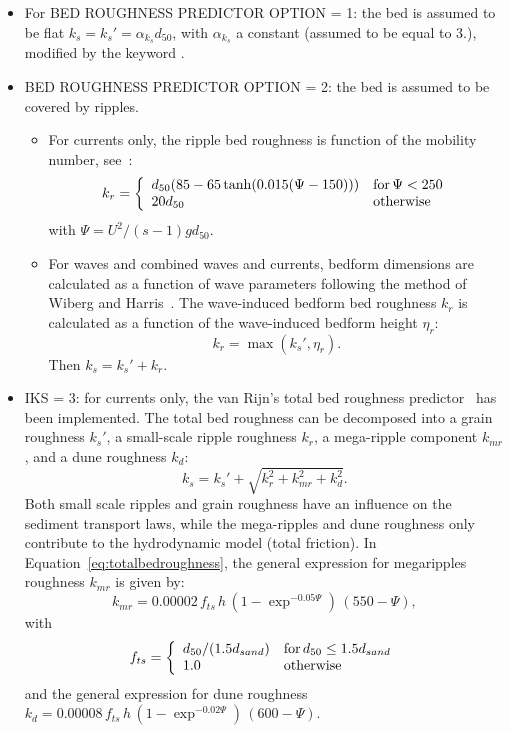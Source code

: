\begin{itemize}
\item For {\ttfamily BED ROUGHNESS PREDICTOR OPTION = 1}: the bed is assumed to be flat $k_s = k_s'= \alpha_{k_s} d_{50}$, with $\alpha_{k_s}$ a constant (assumed to be equal to $3.$), modified by the keyword . 
\item {\ttfamily BED ROUGHNESS PREDICTOR OPTION = 2}: the bed is assumed to be covered by ripples.
  \begin{itemize}
    \item For currents only, the ripple bed roughness is function of the mobility number, see~\cite{vanRijn07}:
\begin{equation*}
k_r =\left\{\begin{array}{ll}
d_{50}(85-65\tanh(0.015(\Psi-150))) & \text{for\,} \Psi<250\\
20 d_{50} & \text{otherwise} 
\end{array}
\right.
\end{equation*}
with $\Psi =U^2/(s-1)gd_{50}$.

    \item For waves and combined waves and currents, bedform dimensions are calculated
as a function of wave parameters following the method of Wiberg and Harris~\cite{WibergHarris}. 
The wave-induced bedform bed roughness $k_r$ is calculated as a function of the wave-induced bedform 
height $\eta_r$: 
\begin{equation}
k_r = \max(k_s', \eta_r).
\end{equation}
Then $k_s=k_s'+k_r$.
  \end{itemize}
 
\item {\ttfamily IKS = 3}: for currents only, the van Rijn's total bed roughness predictor~\cite{vanRijn07, Huybrechts} has been implemented. 
The total bed roughness can be decomposed into a grain
roughness $k_s'$, a small-scale ripple roughness $k_r$, a mega-ripple 
component $k_{mr}$, and a dune roughness $k_d$:
\begin{equation}\label{eq:totalbedroughness}
k_s = k_s' + \sqrt{k_r^2 + k_{mr}^2 + k_d^2}. 
\end{equation}
Both small scale ripples and grain roughness have an influence on the
sediment transport laws, while the mega-ripples and dune roughness only
contribute to the hydrodynamic model (total friction). In Equation~\ref{eq:totalbedroughness}, the general expression for megaripples roughness $k_{mr}$ is given by:
\begin{equation}
k_{mr} = 0.00002\,f_{ts}\,h\,(1-\exp^{-0.05\Psi})\,(550-\Psi),
\end{equation}
with
\begin{equation*}
f_{ts} =\left\{\begin{array}{ll}
d_{50}/(1.5d_{sand}) & \text{for\,} d_{50}\leq 1.5d_{sand}\\
1.0 & \text{otherwise} 
\end{array}
\right.
\end{equation*}
and the general expression for dune roughness $k_d=0.00008\,f_{ts}\,h\,(1-\exp^{-0.02\Psi})\,(600-\Psi)$.


\end{itemize}
